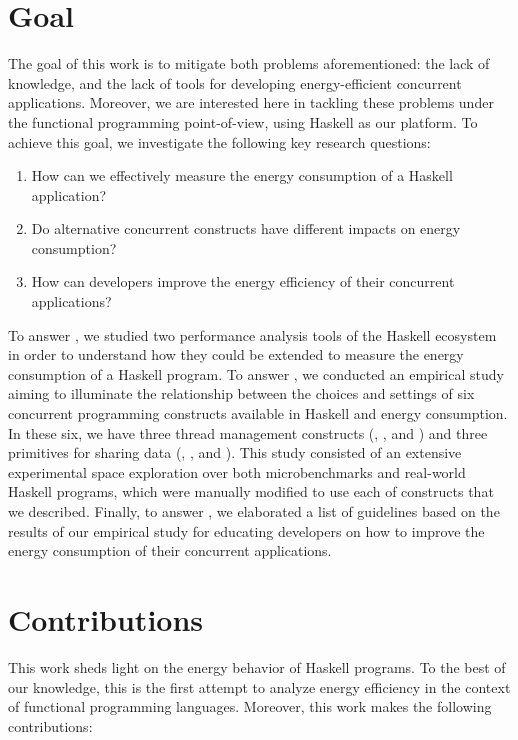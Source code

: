 \section{Goal}
The goal of this work is to mitigate both problems aforementioned: the lack of knowledge, and the lack of tools for developing energy-efficient concurrent applications. Moreover, we are interested here in tackling these problems under the functional programming point-of-view, using Haskell as our platform. To achieve this goal, we investigate the following key research questions:

\begin{enumerate}[label=\RQ{\arabic*}.]
  \item How can we effectively measure the energy consumption of a Haskell application?
  \item Do alternative concurrent constructs have different impacts on energy consumption?
  \item How can developers improve the energy efficiency of their concurrent applications?
\end{enumerate}

To answer , we studied two performance analysis tools of the Haskell ecosystem in order to understand how they could be extended to measure the energy consumption of a Haskell program. To answer , we conducted an empirical study aiming to illuminate the relationship between the choices and settings of six concurrent programming constructs available in Haskell and energy consumption. In these six, we have three thread management constructs (\forkIO, \forkOn, and \forkOS) and three primitives for sharing data (\MVar, \TMVar, and \TVar). This study consisted of an extensive experimental space exploration over both microbenchmarks and real-world Haskell programs, which were manually modified to use each of constructs that we described. Finally, to answer , we elaborated a list of guidelines based on the results of our empirical study for educating developers on how to improve the energy consumption of their concurrent applications.


\section{Contributions}
This work sheds light on the energy behavior of Haskell programs. To the best of our knowledge, this is the first attempt to analyze energy efficiency in the context of functional programming languages. Moreover, this work makes the following contributions:

